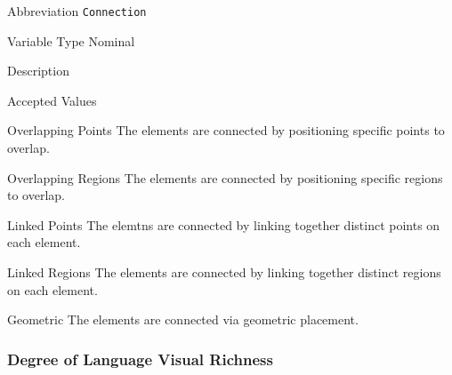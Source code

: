 \begin{AlignedDesc}
  \item[Abbreviation] \texttt{Connection}

  \item[Variable Type] Nominal

  \item[Description]

  \item[Accepted Values]

  \begin{AlignedDesc}
    \item[Overlapping Points] The elements are connected by positioning specific points to overlap.
    \item[Overlapping Regions] The elements are connected by positioning specific regions to overlap.
    \item[Linked Points] The elemtns are connected by linking together distinct points on each element.
    \item[Linked Regions] The elements are connected by linking together distinct regions on each element.
    \item[Geometric] The elements are connected via geometric placement.
  \end{AlignedDesc}

\end{AlignedDesc}

\subsubsection{Degree of Language Visual Richness}
\label{subsubsec:languagerichness}

